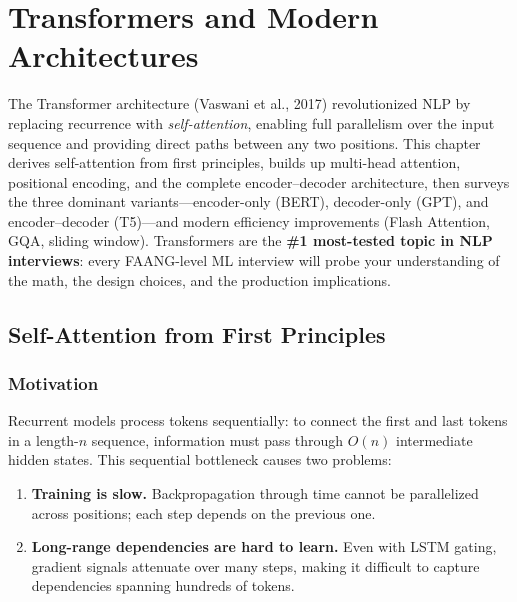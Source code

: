 
\chapter{Transformers and Modern Architectures}
\label{chap:transformers}

\begin{tldr}
The Transformer architecture (Vaswani et al., 2017) revolutionized NLP by replacing
recurrence with \emph{self-attention}, enabling full parallelism over the input sequence
and providing direct paths between any two positions.  This chapter derives
self-attention from first principles, builds up multi-head attention, positional
encoding, and the complete encoder--decoder architecture, then surveys the three
dominant variants---encoder-only (BERT), decoder-only (GPT), and encoder--decoder
(T5)---and modern efficiency improvements (Flash Attention, GQA, sliding window).
Transformers are the \textbf{\#1 most-tested topic in NLP interviews}: every
FAANG-level ML interview will probe your understanding of the math, the design
choices, and the production implications.
\end{tldr}

\bigskip

\section{Self-Attention from First Principles}
\label{sec:self-attention}

\subsection{Motivation}

Recurrent models process tokens sequentially: to connect the first and last
tokens in a length-$n$ sequence, information must pass through $O(n)$
intermediate hidden states.  This sequential bottleneck causes two problems:

\begin{enumerate}
    \item \textbf{Training is slow.}  Backpropagation through time cannot be
          parallelized across positions; each step depends on the previous one.
    \item \textbf{Long-range dependencies are hard to learn.}  Even with LSTM
          gating, gradient signals attenuate over many steps, making it
          difficult to capture dependencies spanning hundreds of tokens.
\end{enumerate}

